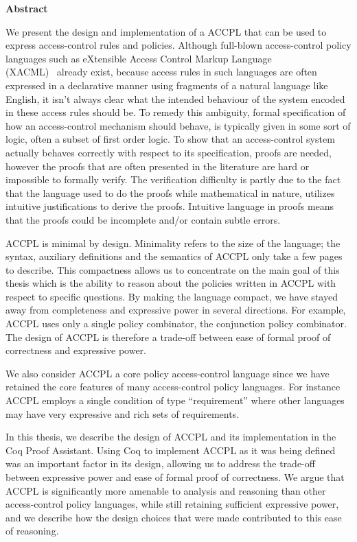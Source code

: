 
\begin{center}\textbf{Abstract}\end{center}

We present the design and implementation of a \ac{ACCPL} that can be used to express access-control rules and policies. Although full-blown access-control policy languages such as eXtensible Access Control Markup Language \\(XACML)~\cite{xacml} already exist, because access rules in such languages are often expressed in a declarative manner using fragments of a natural language like English, it isn't always clear what the intended behaviour of the system encoded in these access rules should be. To remedy this ambiguity, formal specification of how an access-control mechanism should behave, is typically given in some sort of logic, often a subset of first order logic. To show that an access-control system actually behaves correctly with respect to its specification, proofs are needed, however the proofs that are often presented in the literature are hard or impossible to formally verify. The verification difficulty is partly due to the fact that the language used to do the proofs while mathematical in nature, utilizes intuitive justifications to derive the proofs. Intuitive language in proofs means that the proofs could be incomplete and/or contain subtle errors.

\ac{ACCPL} is minimal by design. Minimality refers to the size of the language; the syntax, auxiliary definitions and the semantics of \ac{ACCPL} only take a few pages to describe. This compactness allows us to concentrate on the main goal of this thesis which is the ability to reason about the policies written in \ac{ACCPL} with respect to specific questions. By making the language compact, we have stayed away from completeness and expressive power in several directions. For example, \ac{ACCPL} uses only a single policy combinator, the conjunction policy combinator. The design of \ac{ACCPL} is therefore a trade-off between ease of formal proof of correctness and expressive power.

We also consider \ac{ACCPL} a core policy access-control language since we have retained the core features of many access-control policy languages. For instance \ac{ACCPL} employs a single condition of type ``requirement'' where other languages may have very expressive and rich sets of requirements. 

In this thesis, we describe the design of \ac{ACCPL} and its implementation in the Coq Proof Assistant. Using Coq to implement \ac{ACCPL} as it was being defined was an important factor in its design, allowing us to address the trade-off between expressive power and ease of formal proof of correctness. We argue that \ac{ACCPL} is significantly more amenable to analysis and reasoning than other access-control policy languages, while still retaining sufficient expressive power, and we describe how the design choices that were made contributed to this ease of reasoning. 


